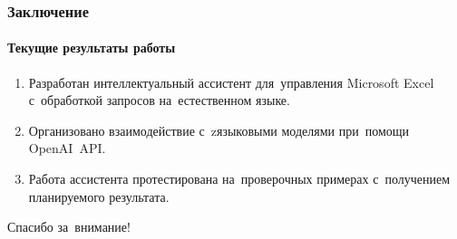 \documentclass{beamer}
\begin{document}
\begin{frame}
  \frametitle{Заключение}
  \framesubtitle{Текущие результаты работы}

  \begin{enumerate}
  \item {
Разработан интеллектуальный ассистент для~управления Microsoft Excel с~обработкой запросов на~естественном языке. 
  }
  \item {
Организовано взаимодействие с~zязыковыми моделями при~помощи OpenAI~API.
  }
  \item {
Работа ассистента протестирована на~проверочных примерах с~получением планируемого результата.
    }
    \end{enumerate}
\end{frame}

\begin{frame}
  \begin{center}
{\Large Спасибо за~внимание!}
    \end{center}
  \end{frame}
\end{document}

